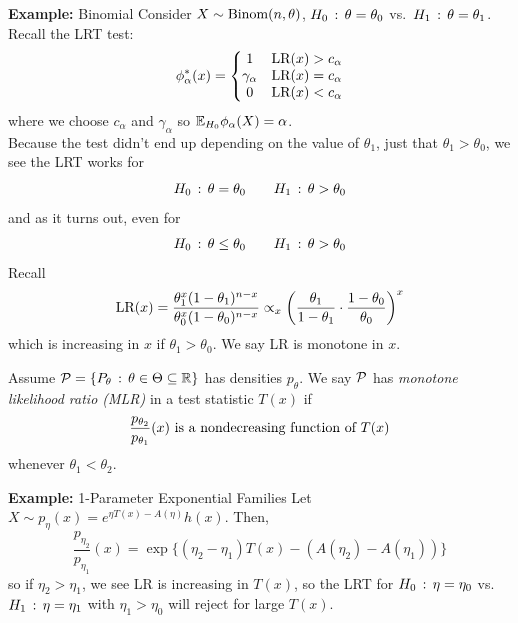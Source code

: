 
\begin{example}{\textbf{Example:} Binomial}
    Consider $X \sim \Binom(n, \theta)$, $H_0 \col \theta = \theta_0$ vs.\ $H_1 \col \theta = \theta_1$. Recall the LRT test:
    \[ \phi_{\alpha}^{*}(x) = \left\{\begin{matrix} 1 & \tt{LR}(x) > c_{\alpha} \\ \gamma_{\alpha} & \tt{LR}(x) = c_{\alpha} \\ 0 & \tt{LR}(x) < c_{\alpha} \end{matrix}\right. \]
    where we choose $c_{\alpha}$ and $\gamma_{\alpha}$ so $\E_{H_0}\phi_{\alpha}(X) = \alpha$.\\

    Because the test didn't end up depending on the value of $\theta_1$, just that $\theta_1 > \theta_0$, we see the LRT works for
    \[ H_0 \col \theta = \theta_0 \qquad H_1 \col \theta > \theta_0 \]
    and as it turns out, even for
    \[ H_0 \col \theta \leq \theta_0 \qquad H_1 \col \theta > \theta_0 \]
    Recall
    \[ \tt{LR}(x) = \frac{\theta_1^{x}(1 - \theta_1)^{n - x}}{\theta_0^{x}(1 - \theta_0)^{n - x}} \propto_{x} \left(\frac{\theta_1}{1 - \theta_1} \cdot \frac{1 - \theta_0}{\theta_0}\right)^{x} \]
    which is increasing in $x$ if $\theta_1 > \theta_0$. We say LR is monotone in $x$.
\end{example}

\begin{definition}
    Assume $\cal{P} = \{P_{\theta} \col \theta \in \Theta \subseteq \R\}$ has densities $p_{\theta}$. We say $\cal{P}$ has \emph{monotone likelihood ratio (MLR)} in a test statistic $T(x)$ if
    \[ \frac{p_{\theta_2}}{p_{\theta_1}}(x) \tt{ is a nondecreasing function of } T(x) \]
    whenever $\theta_1 < \theta_2$.
\end{definition}

\begin{example}{\textbf{Example:} 1-Parameter Exponential Families}
    Let $X \sim p_{\eta}(x) = e^{\eta T(x) - A(\eta)}h(x)$. Then,
    \[ \frac{p_{\eta_2}}{p_{\eta_1}}(x) = \exp\{(\eta_2 - \eta_1)T(x) - (A(\eta_2) - A(\eta_1))\} \]
    so if $\eta_2 > \eta_1$, we see LR is increasing in $T(x)$, so the LRT for $H_0 \col \eta = \eta_0$ vs.\ $H_1 \col \eta = \eta_1$ with $\eta_1 > \eta_0$ will reject for large $T(x)$.
\end{example}

